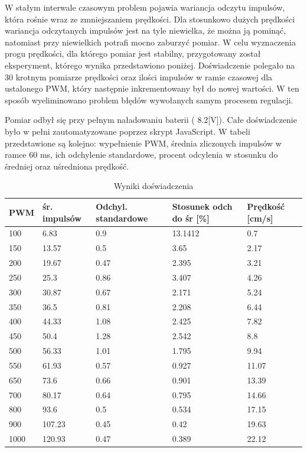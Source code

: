 \documentclass[eng,printmode]{mgr}
\begin{document}
W stałym interwale czasowym problem pojawia wariancja odczytu impulsów, która rośnie wraz ze zmniejszaniem prędkości. Dla stosunkowo dużych prędkości wariancja odczytanych impulsów jest na tyle niewielka, że można ją pominąć, natomiast przy niewielkich potrafi mocno zaburzyć pomiar. W celu wyznaczenia progu prędkości, dla którego pomiar jest stabilny, przygotowany został eksperyment, którego wynika przedstawiono poniżej. Doświadczenie polegało na 30 krotnym pomiarze prędkości oraz ilości impulsów w ramie czasowej dla ustalonego PWM, który następnie inkrementowany był do nowej wartości. W ten sposób wyeliminowano problem błędów wywołanych samym procesem regulacji. 

Pomiar odbył się przy pełnym naładowaniu baterii ( 8.2[V]). Całe doświadczenie było w pełni zautomatyzowane poprzez skrypt JavaScript. W tabeli przedstawione są kolejno: wypełnienie PWM, średnia zliczonych impulsów w ramce  60 ms, ich odchylenie standardowe, procent odcylenia w stosunku do średniej oraz uśredniona prędkość.

\begin{table}[ht]
\centering
\begin{adjustbox}{width=1\textwidth}
\begin{tabular}{ | l | l | l | l | l | }
\hline
	PWM & śr. impulsów & Odchyl. standardowe & Stosunek odch do śr [\%] & Prędkość [cm/s]  \\ \hline
	100 & 6.83 & 0.9 & 13.1412 & 0.7 \\ \hline
	150 & 13.57 & 0.5 & 3.65 & 2.17 \\ \hline
	200 & 19.67 & 0.47 & 2.395 & 3.21 \\ \hline
	250 & 25.3 & 0.86 & 3.407 & 4.26 \\ \hline
	300 & 30.87 & 0.67 & 2.171 & 5.24 \\ \hline
	350 & 36.5 & 0.81 & 2.208 & 6.44 \\ \hline
	400 & 44.33 & 1.08 & 2.425 & 7.82 \\ \hline
	450 & 50.4 & 1.28 & 2.542 & 8.8 \\ \hline
	500 & 56.33 & 1.01 & 1.795 & 9.94 \\ \hline
	550 & 61.93 & 0.57 & 0.927 & 11.07 \\ \hline
	650 & 73.6 & 0.66 & 0.901 & 13.39 \\ \hline
	700 & 80.17 & 0.64 & 0.795 & 14.66 \\ \hline
	800 & 93.6 & 0.5 & 0.534 & 17.15 \\ \hline
	900 & 107.23 & 0.45 & 0.42 & 19.63 \\ \hline
	1000 & 120.93 & 0.47 & 0.389 & 22.12 \\ \hline
\end{tabular}
\end{adjustbox}
\caption{Wyniki doświadczenia} 
\end{table}
\end{document}

